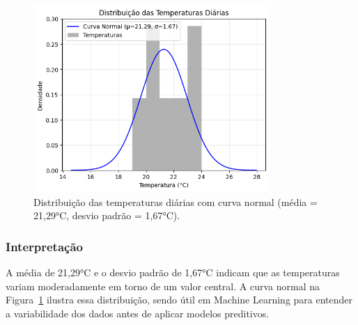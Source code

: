 \documentclass[a4paper,12pt,openany]{book}
\begin{document}
\begin{figure}[ht]
\centering
\includegraphics[width=0.8\textwidth]{curva_normal_temperaturas.png}
\caption{Distribuição das temperaturas diárias com curva normal (média = 21,29°C, desvio padrão = 1,67°C).}
\label{fig:curva_normal}
\end{figure}
    
\subsubsection{Interpretação}
A média de 21,29°C e o desvio padrão de 1,67°C indicam que as temperaturas variam moderadamente em torno de um valor central. A curva normal na Figura~\ref{fig:curva_normal} ilustra essa distribuição, sendo útil em Machine Learning para entender a variabilidade dos dados antes de aplicar modelos preditivos.
\end{document}
